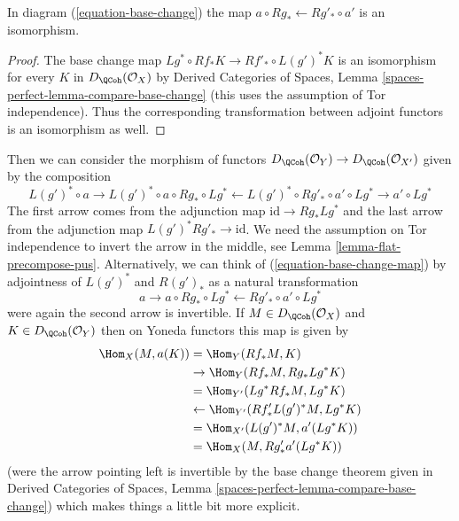 \begin{lemma}
\label{lemma-flat-precompose-pus}
In diagram (\ref{equation-base-change}) the map
$a \circ Rg_* \leftarrow Rg'_* \circ a'$ is an isomorphism.
\end{lemma}

\begin{proof}
The base change map $Lg^* \circ Rf_* K \to Rf'_* \circ L(g')^*K$
is an isomorphism for every $K$ in $D_\QCoh(\mathcal{O}_X)$ by
Derived Categories of Spaces, Lemma
\ref{spaces-perfect-lemma-compare-base-change}
(this uses the assumption of Tor independence).
Thus the corresponding transformation between adjoint functors
is an isomorphism as well.
\end{proof}

\noindent
Then we can consider the
morphism of functors
$D_\QCoh(\mathcal{O}_Y) \to D_\QCoh(\mathcal{O}_{X'})$
given by the composition
\begin{equation}
\label{equation-base-change-map}
L(g')^* \circ a \to
L(g')^* \circ a \circ Rg_* \circ Lg^* \leftarrow
L(g')^* \circ Rg'_* \circ a' \circ Lg^* \to a' \circ Lg^*
\end{equation}
The first arrow comes from the adjunction map $\text{id} \to Rg_* Lg^*$
and the last arrow from the adjunction map $L(g')^*Rg'_* \to \text{id}$.
We need the assumption on Tor independence to invert the arrow
in the middle, see Lemma \ref{lemma-flat-precompose-pus}.
Alternatively, we can think of (\ref{equation-base-change-map}) by
adjointness of $L(g')^*$ and $R(g')_*$ as a natural transformation
$$
a \to a \circ Rg_* \circ Lg^* \leftarrow Rg'_* \circ a' \circ Lg^*
$$
were again the second arrow is invertible. If $M \in D_\QCoh(\mathcal{O}_X)$
and $K \in D_\QCoh(\mathcal{O}_Y)$
then on Yoneda functors this map is given by
\begin{align*}
\Hom_X(M, a(K))
& =
\Hom_Y(Rf_*M, K) \\
& \to
\Hom_Y(Rf_*M, Rg_* Lg^*K) \\
& =
\Hom_{Y'}(Lg^*Rf_*M, Lg^*K) \\
& \leftarrow
\Hom_{Y'}(Rf'_* L(g')^*M, Lg^*K) \\
& =
\Hom_{X'}(L(g')^*M, a'(Lg^*K)) \\
& =
\Hom_X(M, Rg'_*a'(Lg^*K))
\end{align*}
(were the arrow pointing left is invertible by the base
change theorem given in
Derived Categories of Spaces, Lemma
\ref{spaces-perfect-lemma-compare-base-change})
which makes things a little bit more explicit.

